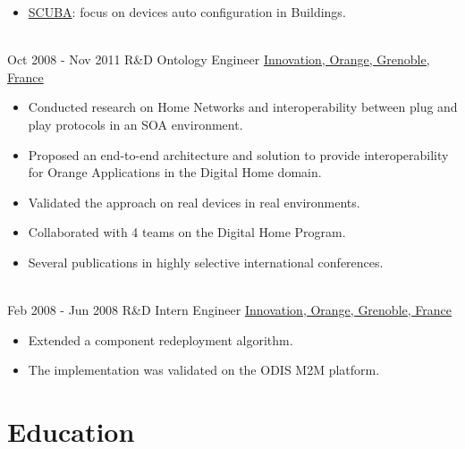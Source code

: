 \documentclass[letterpaper]{twentysecondcv} %
\begin{document}
\begin{twenty}
{\begin{itemize}
\begin{itemize}
\item \href{http://www.aws.cit.ie/scuba/}{SCUBA}: focus on devices auto configuration in Buildings.
\end{itemize}
\end{itemize}}
\\
\twentyitem
{Oct 2008 -}
{Nov 2011}
{R\&D Ontology Engineer}
{\href{https://www.orange.com/en/home}{Innovation, Orange, Grenoble, France}}
{}
{
\begin{itemize}
\item Conducted research on Home Networks and interoperability between plug and play protocols in an SOA environment.
\item Proposed an end-to-end architecture and solution to provide interoperability for Orange Applications in the Digital Home domain.
\item Validated the approach on real devices in real environments.
\item Collaborated with 4 teams on the Digital Home Program.
\item Several publications in highly selective international conferences.
\end{itemize}}
\\
\twentyitem
{Feb 2008 -}
{Jun 2008}
{R\&D Intern Engineer}
{\href{https://www.orange.com/en/home}{Innovation, Orange, Grenoble, France}}
{}
{
\begin{itemize}
\item Extended a component redeployment algorithm. 
\item The implementation was validated on the ODIS M2M platform.
\end{itemize}}
\end{twenty}




\section{Education}
                           

 
\end{document}
